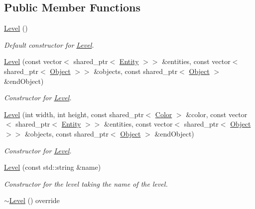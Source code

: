 \subsection*{Public Member Functions}
\begin{DoxyCompactItemize}
\item 
\mbox{\label{classLevel_a7a696c928ca5d5354db6e50e46d0f67d}} 
\hyperlink{classLevel_a7a696c928ca5d5354db6e50e46d0f67d}{Level} ()
\begin{DoxyCompactList}\small\item\em Default constructor for \hyperlink{classLevel}{Level}. \end{DoxyCompactList}\item 
\hyperlink{classLevel_a0bf031e33189b15e8ba66d8879fe3f34}{Level} (const vector$<$ shared\+\_\+ptr$<$ \hyperlink{classEntity}{Entity} $>$$>$ \&entities, const vector$<$ shared\+\_\+ptr$<$ \hyperlink{classObject}{Object} $>$$>$ \&objects, const shared\+\_\+ptr$<$ \hyperlink{classObject}{Object} $>$ \&end\+Object)
\begin{DoxyCompactList}\small\item\em Constructor for \hyperlink{classLevel}{Level}. \end{DoxyCompactList}\item 
\hyperlink{classLevel_ad71d8c6cdc4cb49a4f9be2c3db35ab20}{Level} (int width, int height, const shared\+\_\+ptr$<$ \hyperlink{structColor}{Color} $>$ \&color, const vector$<$ shared\+\_\+ptr$<$ \hyperlink{classEntity}{Entity} $>$$>$ \&entities, const vector$<$ shared\+\_\+ptr$<$ \hyperlink{classObject}{Object} $>$$>$ \&objects, const shared\+\_\+ptr$<$ \hyperlink{classObject}{Object} $>$ \&end\+Object)
\begin{DoxyCompactList}\small\item\em Constructor for \hyperlink{classLevel}{Level}. \end{DoxyCompactList}\item 
\hyperlink{classLevel_a4c7d4e89ea59866f0fc760b382cedaec}{Level} (const std\+::string \&name)
\begin{DoxyCompactList}\small\item\em Constructor for the level taking the name of the level. \end{DoxyCompactList}\item 
\mbox{\label{classLevel_ac4103beac366d4c7649f959d8d9f780e}} 
\hyperlink{classLevel_ac4103beac366d4c7649f959d8d9f780e}{$\sim$\+Level} () override

\end{DoxyCompactItemize}
